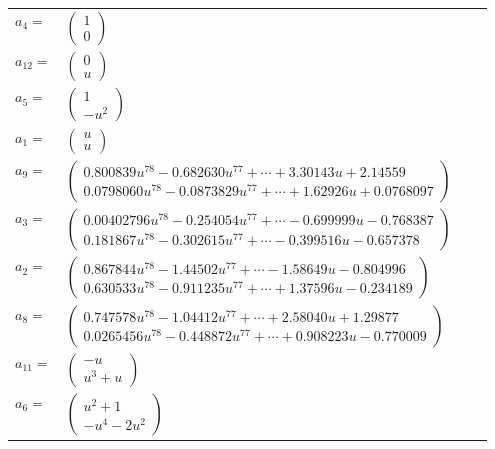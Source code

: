 \documentclass[1p]{elsarticle_modified}
\theoremstyle{definition}
\begin{document}
\begin{tabular}{m{7pt} m{180pt} m{7pt} m{180pt} }
\flushright $a_{4}=$&$\begin{pmatrix}1\\0\end{pmatrix}$ \\
\flushright $a_{12}=$&$\begin{pmatrix}0\\u\end{pmatrix}$ \\
\flushright $a_{5}=$&$\begin{pmatrix}1\\- u^2\end{pmatrix}$ \\
\flushright $a_{1}=$&$\begin{pmatrix}u\\u\end{pmatrix}$ \\
\flushright $a_{9}=$&$\begin{pmatrix}0.800839 u^{78}-0.682630 u^{77}+\cdots+3.30143 u+2.14559\\0.0798060 u^{78}-0.0873829 u^{77}+\cdots+1.62926 u+0.0768097\end{pmatrix}$ \\
\flushright $a_{3}=$&$\begin{pmatrix}0.00402796 u^{78}-0.254054 u^{77}+\cdots-0.699999 u-0.768387\\0.181867 u^{78}-0.302615 u^{77}+\cdots-0.399516 u-0.657378\end{pmatrix}$ \\
\flushright $a_{2}=$&$\begin{pmatrix}0.867844 u^{78}-1.44502 u^{77}+\cdots-1.58649 u-0.804996\\0.630533 u^{78}-0.911235 u^{77}+\cdots+1.37596 u-0.234189\end{pmatrix}$ \\
\flushright $a_{8}=$&$\begin{pmatrix}0.747578 u^{78}-1.04412 u^{77}+\cdots+2.58040 u+1.29877\\0.0265456 u^{78}-0.448872 u^{77}+\cdots+0.908223 u-0.770009\end{pmatrix}$ \\
\flushright $a_{11}=$&$\begin{pmatrix}- u\\u^3+u\end{pmatrix}$ \\
\flushright $a_{6}=$&$\begin{pmatrix}u^2+1\\- u^4-2 u^2\end{pmatrix}$ \\

\end{tabular}
\end{document}
